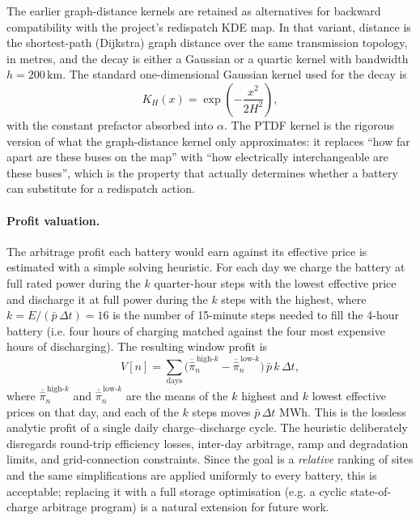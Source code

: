 The earlier graph-distance kernels are retained as alternatives for backward compatibility with the project's redispatch KDE map. In that variant, distance is the shortest-path (Dijkstra) graph distance over the same transmission topology, in metres, and the decay is either a Gaussian or a quartic kernel with bandwidth $h = 200\,\text{km}$. The standard one-dimensional Gaussian kernel used for the decay is
\begin{equation}
\label{eq:gaussian_kernel}
K_H(x) = \exp\!\left(-\frac{x^2}{2H^2}\right),
\end{equation}
with the constant prefactor absorbed into $\alpha$. The PTDF kernel is the rigorous version of what the graph-distance kernel only approximates: it replaces ``how far apart are these buses on the map'' with ``how electrically interchangeable are these buses'', which is the property that actually determines whether a battery can substitute for a redispatch action.

\paragraph{Profit valuation.}
The arbitrage profit each battery would earn against its effective price is estimated with a simple solving heuristic. For each day we charge the battery at full rated power during the $k$ quarter-hour steps with the lowest effective price and discharge it at full power during the $k$ steps with the highest, where $k = E/(\bar{p}\,\Delta t) = 16$ is the number of 15-minute steps needed to fill the 4-hour battery (i.e. four hours of charging matched against the four most expensive hours of discharging). The resulting window profit is
\begin{equation}
\label{eq:heuristic_profit}
V[n] = \sum_{\text{days}} \Big( \overline{\hat{\pi}}^{\,\text{high-}k}_{n} - \overline{\hat{\pi}}^{\,\text{low-}k}_{n} \Big)\, \bar{p}\, k\, \Delta t,
\end{equation}
where $\overline{\hat{\pi}}^{\,\text{high-}k}_{n}$ and $\overline{\hat{\pi}}^{\,\text{low-}k}_{n}$ are the means of the $k$ highest and $k$ lowest effective prices on that day, and each of the $k$ steps moves $\bar{p}\,\Delta t$ MWh. This is the lossless analytic profit of a single daily charge--discharge cycle. The heuristic deliberately disregards round-trip efficiency losses, inter-day arbitrage, ramp and degradation limits, and grid-connection constraints. Since the goal is a \emph{relative} ranking of sites and the same simplifications are applied uniformly to every battery, this is acceptable; replacing it with a full storage optimisation (e.g. a cyclic state-of-charge arbitrage program) is a natural extension for future work.

